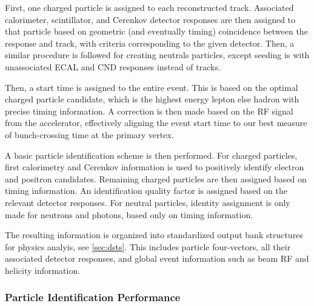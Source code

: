 \documentclass[3p,times,twocolumn]{elsarticle}
\begin{document}
First, one charged particle is assigned to each reconstructed track.  Associated calorimeter, scintillator, and C{e}renkov detector responses are then assigned to that particle based on geometric (and eventually timing) coincidence between the response and track, with criteria corresponding to the given detector.  Then, a similar procedure is followed for creating neutrals particles, except seeding is with unassociated ECAL and CND responses instead of tracks.

Then, a start time is assigned to the entire event.  This is based on the optimal charged particle candidate, which is the highest energy lepton else hadron with precise timing information.  A correction is then made based on the RF signal from the accelerator, effectively aligning the event start time to our best measure of bunch-crossing time at the primary vertex.

A basic particle identification scheme is then performed.  For charged particles, first calorimetry and Cerenkov information is used to positively identify electron and positron candidates.  Remaining charged particles are then assigned based on timing information.  An identification quality factor is assigned based on the relevant detector responses.  For neutral particles, identity assignment is only made for neutrons and photons, based only on timing information.

The resulting information is organized into standardized output bank structures for physics analyis, see \ref{sec:dsts}.  This includes particle four-vectors, all their associated detector responses, and global event information such as beam RF and helicity information.

\newpage
\subsubsection{Particle Identification Performance}
\end{document}
